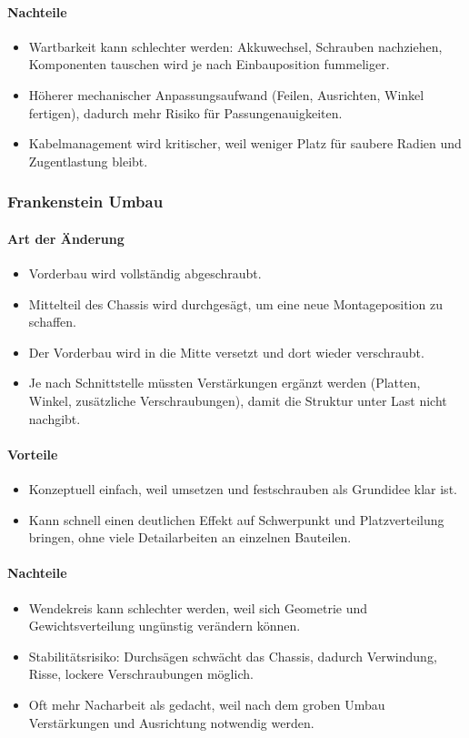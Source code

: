 \paragraph{Nachteile}
\begin{itemize}
  \item Wartbarkeit kann schlechter werden: Akkuwechsel, Schrauben nachziehen, Komponenten tauschen wird je nach Einbauposition fummeliger.
  \item Höherer mechanischer Anpassungsaufwand (Feilen, Ausrichten, Winkel fertigen), dadurch mehr Risiko für Passungenauigkeiten.
  \item Kabelmanagement wird kritischer, weil weniger Platz für saubere Radien und Zugentlastung bleibt.
\end{itemize}

\subsubsection{Frankenstein Umbau}
\paragraph{Art der Änderung}
\begin{itemize}
  \item Vorderbau wird vollständig abgeschraubt.
  \item Mittelteil des Chassis wird durchgesägt, um eine neue Montageposition zu schaffen.
  \item Der Vorderbau wird in die Mitte versetzt und dort wieder verschraubt.
  \item Je nach Schnittstelle müssten Verstärkungen ergänzt werden (Platten, Winkel, zusätzliche Verschraubungen), damit die Struktur unter Last nicht nachgibt.
\end{itemize}

\paragraph{Vorteile}
\begin{itemize}
  \item Konzeptuell einfach, weil umsetzen und festschrauben als Grundidee klar ist.
  \item Kann schnell einen deutlichen Effekt auf Schwerpunkt und Platzverteilung bringen, ohne viele Detailarbeiten an einzelnen Bauteilen.
\end{itemize}

\paragraph{Nachteile}
\begin{itemize}
  \item Wendekreis kann schlechter werden, weil sich Geometrie und Gewichtsverteilung ungünstig verändern können.
  \item Stabilitätsrisiko: Durchsägen schwächt das Chassis, dadurch Verwindung, Risse, lockere Verschraubungen möglich.
  \item Oft mehr Nacharbeit als gedacht, weil nach dem groben Umbau Verstärkungen und Ausrichtung notwendig werden.
\end{itemize}

